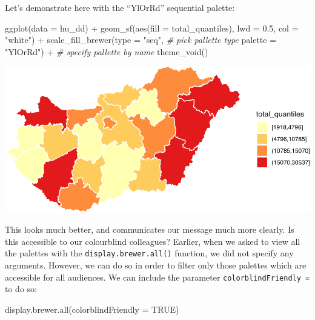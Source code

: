 \documentclass[
  krantz2]{krantz}
\makeatletter
\newenvironment{Shaded}{\begin{snugshade}}{\end{snugshade}}
\newcommand{\AttributeTok}[1]{\textcolor[rgb]{0.61,0.61,0.61}{#1}}
\newcommand{\CommentTok}[1]{\textcolor[rgb]{0.37,0.37,0.37}{\textit{#1}}}
\newcommand{\ConstantTok}[1]{\textcolor[rgb]{0,0,0}{#1}}
\newcommand{\FloatTok}[1]{\textcolor[rgb]{0.06,0.06,0.06}{#1}}
\newcommand{\FunctionTok}[1]{\textcolor[rgb]{0,0,0}{#1}}
\newcommand{\NormalTok}[1]{#1}
\newcommand{\SpecialCharTok}[1]{\textcolor[rgb]{0,0,0}{#1}}
\newcommand{\StringTok}[1]{\textcolor[rgb]{0.5,0.5,0.5}{#1}}
\newenvironment{kframe}{%
\medskip{}
\setlength{\fboxsep}{.8em}
 \def\at@end@of@kframe{}%
 \ifinner\ifhmode%
  \def\at@end@of@kframe{\end{minipage}}%
  \begin{minipage}{\columnwidth}%
 \fi\fi%
 \def\FrameCommand##1{\hskip\@totalleftmargin \hskip-\fboxsep
 \colorbox{shadecolor}{##1}\hskip-\fboxsep
     \hskip-\linewidth \hskip-\@totalleftmargin \hskip\columnwidth}%
 \MakeFramed {\advance\hsize-\width
   \@totalleftmargin\z@ \linewidth\hsize
   \@setminipage}}%
 {\par\unskip\endMakeFramed%
 \at@end@of@kframe}
\renewenvironment{Shaded}{\begin{kframe}}{\end{kframe}}
\makeatother
\begin{document}
Let's demonstrate here with the ``YlOrRd'' sequential palette:

\begin{Shaded}
\begin{Highlighting}[]
\FunctionTok{ggplot}\NormalTok{(}\AttributeTok{data =}\NormalTok{ hu\_dd) }\SpecialCharTok{+} 
  \FunctionTok{geom\_sf}\NormalTok{(}\FunctionTok{aes}\NormalTok{(}\AttributeTok{fill =}\NormalTok{ total\_quantiles), }
          \AttributeTok{lwd =} \FloatTok{0.5}\NormalTok{, }
          \AttributeTok{col =} \StringTok{"white"}\NormalTok{) }\SpecialCharTok{+} 
  \FunctionTok{scale\_fill\_brewer}\NormalTok{(}\AttributeTok{type =} \StringTok{"seq"}\NormalTok{,   }\CommentTok{\# pick pallette type}
                    \AttributeTok{palette =} \StringTok{"YlOrRd"}\NormalTok{) }\SpecialCharTok{+}  \CommentTok{\# specify pallette by name}
  \FunctionTok{theme\_void}\NormalTok{()}
\end{Highlighting}
\end{Shaded}

\includegraphics{crime_mapping_files/figure-latex/colourbbrewerratefill-1.pdf}

This looks much better, and communicates our message much more clearly. Is this accessible to our colourblind colleagues? Earlier, when we asked to view all the palettes with the \texttt{display.brewer.all()} function, we did not specify any arguments. However, we can do so in order to filter only those palettes which are accessible for all audiences. We can include the parameter \texttt{colorblindFriendly\ =} to do so:

\begin{Shaded}
\begin{Highlighting}[]
\FunctionTok{display.brewer.all}\NormalTok{(}\AttributeTok{colorblindFriendly =} \ConstantTok{TRUE}\NormalTok{)}
\end{Highlighting}
\end{Shaded}
\end{document}
